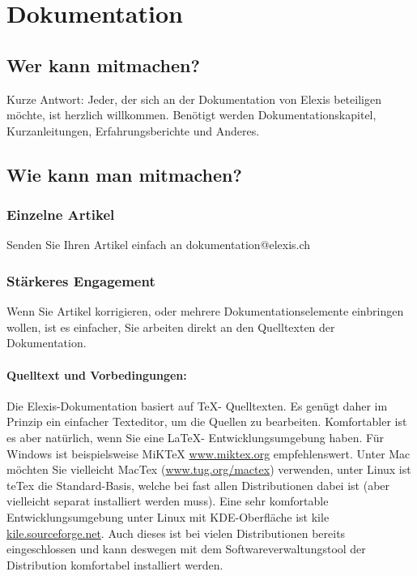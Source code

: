\chapter{Dokumentation}
\section{Wer kann mitmachen?}
\label{dokumentation}
Kurze Antwort: Jeder, der sich an der Dokumentation von Elexis beteiligen
möchte, ist herzlich willkommen. Benötigt werden Dokumentationskapitel,
Kurzanleitungen, Erfahrungsberichte und Anderes.

\section{Wie kann man mitmachen?}
\subsection{Einzelne Artikel}
Senden Sie Ihren Artikel einfach an dokumentation@elexis.ch
\subsection{Stärkeres Engagement}
Wenn Sie Artikel korrigieren, oder mehrere Dokumentationselemente einbringen
wollen, ist es einfacher, Sie arbeiten direkt an den Quelltexten der
Dokumentation.
\subsubsection{Quelltext und Vorbedingungen:}
Die Elexis-Dokumentation basiert auf \TeX - Quelltexten. Es genügt daher im
Prinzip ein einfacher Texteditor, um die Quellen zu bearbeiten. Komfortabler ist
es aber natürlich, wenn Sie eine \LaTeX - Entwicklungsumgebung haben. Für Windows
ist beispielsweise MiKTeX \href{http://www.miktex.org}{www.miktex.org}
empfehlenswert. Unter Mac möchten Sie vielleicht MacTex
(\href{http://www.tug.org/mactex}{www.tug.org/mactex}) verwenden, unter Linux
ist teTex die Standard-Basis, welche bei fast allen Distributionen dabei ist
(aber vielleicht separat installiert werden muss). Eine sehr komfortable
Entwicklungsumgebung unter Linux mit KDE-Oberfläche ist kile
\href{http://kile.sourceforge.net/}{kile.sourceforge.net}. Auch dieses ist bei
vielen Distributionen bereits eingeschlossen und kann deswegen mit dem
Softwareverwaltungstool der Distribution komfortabel installiert werden.

